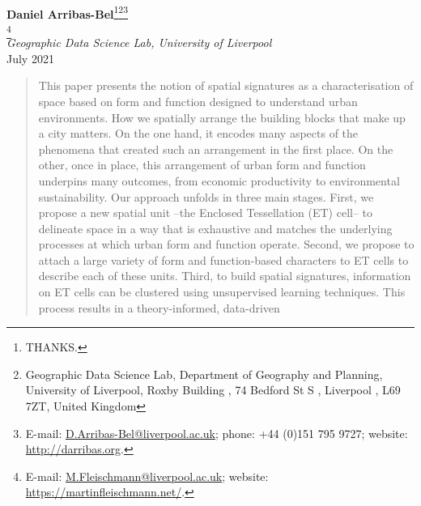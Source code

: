 \documentclass[pdftex,letterpaper,11pt]{article}%
\begin{document}
\begin{titlepage}
\vspace*{1ex}
\begin{minipage}{\textwidth}
\begin{center}%

    {}\\[4ex]%


{\Large\textbf{Daniel Arribas-Bel}\footnote[1]{THANKS.}\footnote[2]{Geographic
Data Science Lab, Department of Geography and Planning, University of
Liverpool, Roxby Building , 74 Bedford St S , Liverpool , L69 7ZT, United
Kingdom}\footnote[3]{E-mail: \url{D.Arribas-Bel@liverpool.ac.uk}; phone: +44 (0)151 795 9727; website: \url{http://darribas.org}.
}}\\[1mm]
%
{\Large{}\footnotemark[1]\footnotemark[2]\footnote[4]{
E-mail: \url{M.Fleischmann@liverpool.ac.uk}; website: \url{https://martinfleischmann.net/}.}}\\[1mm]
{\large\textit{Geographic Data Science Lab, University of Liverpool} }\\[2.5ex]
%
July 2021\vspace{1.5ex}
%
\end{center}
%
\begin{abstract}
        This paper presents the notion of spatial signatures as a
        characterisation of space based on form and function designed to
        understand urban environments.
How we spatially arrange the building blocks that make up a city matters. On
the one hand, it encodes many aspects of the phenomena
that created such an arrangement in the first place. On the other, once in
place, this arrangement of urban form and function underpins many
outcomes, from economic productivity to environmental sustainability.
Our approach unfolds in three main stages.
First, we propose a new spatial unit --the Enclosed Tessellation (ET) cell-- to
delineate space in a way that is exhaustive and matches the underlying
processes at which urban form and function operate.
Second, we propose to attach a large variety of form and function-based
characters to ET cells to describe each of these units.
Third, to build spatial signatures, information on ET cells can be clustered
using unsupervised learning techniques.
This process results in a theory-informed, data-driven

\end{abstract}
\end{minipage}
\end{titlepage}
\end{document}
